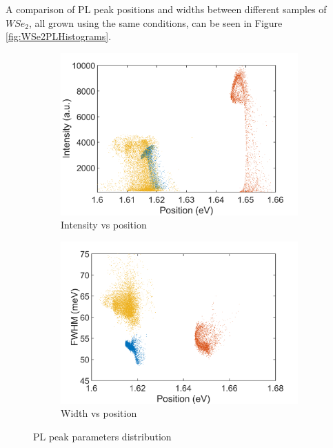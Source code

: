 A comparison of PL peak positions and widths between different samples of $WSe_2$, all grown using the same conditions, can be seen in Figure \ref{fig:WSe2PLHistograms}.

\begin{figure}[!h]
	\begin{center}
		\begin{subfigure}[b]{0.45\textwidth}
			\includegraphics[width=\textwidth]{WSe2/WSe2PositionIntensityScatterComparison.png}
			\caption{Intensity vs position}
			\label{fig:WSe2PositionIntensityScatterComparison}
		\end{subfigure}
		\qquad
		\begin{subfigure}[b]{0.45\textwidth}
			\includegraphics[width=\textwidth]{WSe2/Wse2PositionWidthScatterComparison.png}
			\caption{Width vs position}
			\label{fig:WSe2PositionWidthScatterComparison}
		\end{subfigure}
		\caption{PL peak parameters distribution}
		\label{fig:WSe2ScatterComparison}
	\end{center}
\end{figure}

